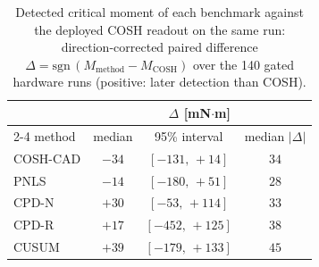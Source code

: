 \begin{table}[t]
\caption{Detected critical moment of each benchmark
against the deployed COSH readout on the same run:
direction-corrected paired difference
$\Delta = \mathrm{sgn}\,(M_{\mathrm{method}} -
M_{\mathrm{COSH}})$ over the 140 gated hardware runs
(positive: later detection than COSH).}
\label{tab:mcrit_method_diff}
\centering\small
\begin{tabular}{@{}lccc@{}}
\toprule
 & \multicolumn{3}{c}{$\Delta$ [mN$\cdot$m]}\\
\cmidrule(l){2-4}
method & median & 95\% interval & median $|\Delta|$\\
\midrule
COSH-CAD & $-34$ & $[-131,\,+14]$ & $34$\\
PNLS & $-14$ & $[-180,\,+51]$ & $28$\\
CPD-N & $+30$ & $[-53,\,+114]$ & $33$\\
CPD-R & $+17$ & $[-452,\,+125]$ & $38$\\
CUSUM & $+39$ & $[-179,\,+133]$ & $45$\\
\bottomrule
\end{tabular}
\end{table}
